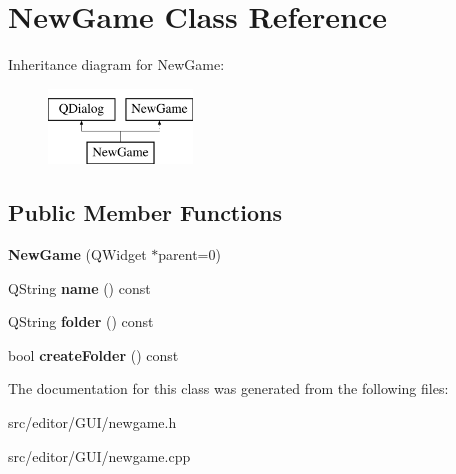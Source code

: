 \hypertarget{class_new_game}{}\section{New\+Game Class Reference}
\label{class_new_game}
Inheritance diagram for New\+Game\+:\begin{figure}[H]
\begin{center}
\leavevmode
\includegraphics[height=2.000000cm]{class_new_game}
\end{center}
\end{figure}
\subsection*{Public Member Functions}
\begin{DoxyCompactItemize}
\item 
\hypertarget{class_new_game_abc0dccbe2a43eef32570473265de9a8a}{}\label{class_new_game_abc0dccbe2a43eef32570473265de9a8a} 
{\bfseries New\+Game} (Q\+Widget $\ast$parent=0)
\item 
\hypertarget{class_new_game_a7b5f6ffcebe4f5dbe96372cbfaf9de3a}{}\label{class_new_game_a7b5f6ffcebe4f5dbe96372cbfaf9de3a} 
Q\+String {\bfseries name} () const
\item 
\hypertarget{class_new_game_a1ab8fb8015c1d3ca2b7c3801d5bc8f23}{}\label{class_new_game_a1ab8fb8015c1d3ca2b7c3801d5bc8f23} 
Q\+String {\bfseries folder} () const
\item 
\hypertarget{class_new_game_ad0df6a6d5310bcb1817c9c2ed390a3d9}{}\label{class_new_game_ad0df6a6d5310bcb1817c9c2ed390a3d9} 
bool {\bfseries create\+Folder} () const
\end{DoxyCompactItemize}


The documentation for this class was generated from the following files\+:\begin{DoxyCompactItemize}
\item 
src/editor/\+G\+U\+I/newgame.\+h\item 
src/editor/\+G\+U\+I/newgame.\+cpp\end{DoxyCompactItemize}
